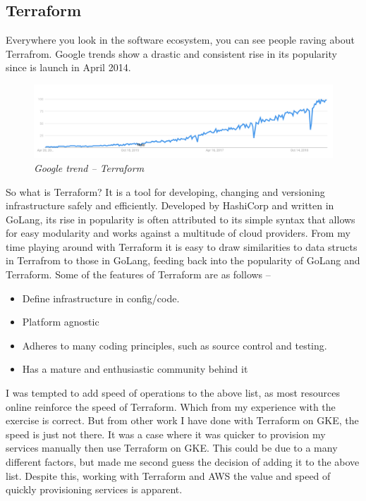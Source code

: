 \subsection{Terraform}
Everywhere you look in the software ecosystem, you can see people raving about Terrafrom. Google trends show a drastic and consistent rise in its popularity since is launch in April 2014.
\begin{figure}[!ht]
\centering
\includegraphics*[width=1\textwidth]{images/google-trend.png}
\caption{\em Google trend -- Terraform}
\label{img:p1}
\end{figure}
So what is Terraform? It is a tool for developing, changing and versioning infrastructure safely and efficiently. Developed by HashiCorp and written in GoLang, its rise in popularity is often attributed to its simple syntax that allows for easy modularity and works against a multitude of cloud providers. From my time playing around with Terraform it is easy to draw similarities to data structs in Terrafrom to those in GoLang, feeding back into the popularity of GoLang and Terraform. Some of the features of Terraform are as follows -- 
\begin{itemize}
    \item Define infrastructure in config/code.
    \item Platform agnostic
    \item Adheres to many coding principles, such as source control and testing.
    \item Has a mature and enthusiastic community behind it
\end{itemize}
I was tempted to add speed of operations to the above list, as most resources online reinforce the speed of Terraform. Which from my experience with the exercise is correct. But from other work I have done with Terraform on GKE, the speed is just not there. It was a case where it was quicker to provision my services manually then use Terraform on GKE. This could be due to a many different factors, but made me second guess the decision of adding it to the above list. Despite this, working with Terraform and AWS the value and speed of quickly provisioning services is apparent.

